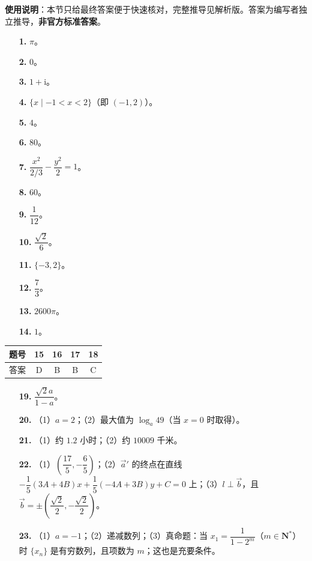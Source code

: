 
\begin{gknotice}
\textbf{使用说明}：本节只给最终答案便于快速核对，完整推导见解析版。答案为编写者独立推导，\textbf{非官方标准答案}。
\end{gknotice}

\begin{itemize}[leftmargin=2.6em]
  \item[\textbf{1.}] $\pi$。
  \item[\textbf{2.}] $0$。
  \item[\textbf{3.}] $1+\mathrm i$。
  \item[\textbf{4.}] $\{x\mid -1<x<2\}$（即 $(-1,2)$）。
  \item[\textbf{5.}] $4$。
  \item[\textbf{6.}] $80$。
  \item[\textbf{7.}] $\dfrac{x^2}{2/3}-\dfrac{y^2}{2}=1$。
  \item[\textbf{8.}] $60$。
  \item[\textbf{9.}] $\dfrac1{12}$。
  \item[\textbf{10.}] $\dfrac{\sqrt2}{6}$。
  \item[\textbf{11.}] $\{-3,2\}$。
  \item[\textbf{12.}] $\dfrac73$。
  \item[\textbf{13.}] $2600\pi$。
  \item[\textbf{14.}] $1$。
\end{itemize}

\begin{center}\begin{tabular}{ccccc}
\toprule
题号 & 15 & 16 & 17 & 18 \\
\midrule
答案 & D & B & B & C \\
\bottomrule
\end{tabular}\end{center}

\begin{itemize}[leftmargin=2.6em]
  \item[\textbf{19.}] $\dfrac{\sqrt2a}{1-a}$。
  \item[\textbf{20.}] （1）$a=2$；（2）最大值为 $\log_a 49$（当 $x=0$ 时取得）。
  \item[\textbf{21.}] （1）约 $1.2$ 小时；（2）约 $10009$ 千米。
  \item[\textbf{22.}] （1）$\left(\dfrac{17}{5},-\dfrac65\right)$；（2）$\vec a'$ 的终点在直线 $-\dfrac15(3A+4B)x+\dfrac15(-4A+3B)y+C=0$ 上；（3）$l\perp\vec b$，且 $\vec b=\pm\left(\dfrac{\sqrt2}{2},-\dfrac{\sqrt2}{2}\right)$。
  \item[\textbf{23.}] （1）$a=-1$；（2）递减数列；（3）真命题：当 $x_1=\dfrac{1}{1-2^m}$（$m\in\mathbf N^*$）时 $\{x_n\}$ 是有穷数列，且项数为 $m$；这也是充要条件。
\end{itemize}
